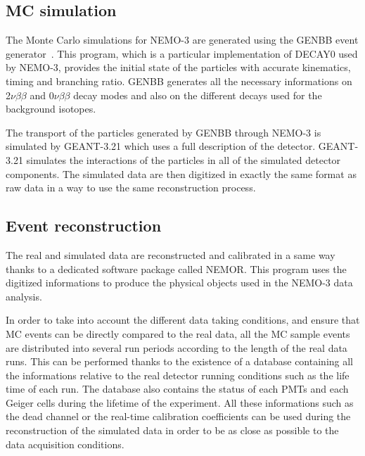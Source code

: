 \documentclass[main.tex]{subfiles}
\begin{document}
\subsection{MC simulation}\label{sec:MCsimu}


\NI The Monte Carlo simulations for NEMO-3 are generated using the GENBB event generator~\cite{GENBB}. This program, which is a particular implementation of DECAY0 used by NEMO-3, provides the initial state of the particles with accurate kinematics, timing and branching ratio. GENBB generates all the necessary informations on 2$\nu\beta\beta$ and 0$\nu\beta\beta$ decay modes and also on the different decays used for the background isotopes.


\bigskip


\NI The transport of the particles generated by GENBB through NEMO-3 is simulated by GEANT-3.21 \cite{GEANT3} which uses a full description of the detector. GEANT-3.21 simulates the interactions of the particles in all of the simulated detector components. The simulated data are then digitized in exactly the same format as raw data in a way to use the same reconstruction process.   


\subsection{Event reconstruction}\label{sec:RecoNEMOR}


\NI The real and simulated data are reconstructed and calibrated in a same way thanks to a dedicated software package called NEMOR. This program uses the digitized informations to produce the physical objects used in the NEMO-3 data analysis. 


\bigskip


\NI In order to take into account the different data taking conditions, and ensure that MC events can be directly compared to the real data, all the MC sample events are distributed into several run periods according to the length of the real data runs.  This can be performed thanks to the existence of a database containing all the informations relative to the real detector running conditions such as the life time of each run. The database also contains the status of each PMTs and each Geiger cells during the lifetime of the experiment. All these informations such as the dead channel or the real-time calibration coefficients can be used during the reconstruction of the simulated data in order to be as close as possible to the data acquisition conditions.  
\end{document}
